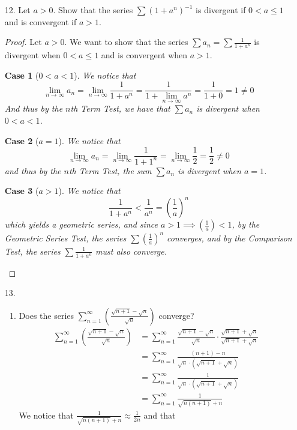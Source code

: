 \documentclass[12pt,letterpaper]{article}
\newcommand{\limx}[2]{\displaystyle\lim\limits_{#1 \to #2}}
\theoremstyle{case}
\newtheorem{case}{Case}
\theoremstyle{definition}
\begin{document}
\begin{enumerate}
\begin{enumerate}
			\item[12.] Let $a > 0$. Show that the series $\sum (1+a^n)^{-1}$ is divergent if $0<a\leq 1$ and is convergent if $a>1$.
			\begin{proof}
				Let $a > 0$. We want to show that the series $\displaystyle \sum a_n=\sum\frac{1}{1+a^n}$ is divergent when $0 < a \leq 1$ and is convergent when $a > 1$.
				\begin{case}[$0<a<1$]
					We notice that
					\[\limx{n}{\infty} a_n = \limx{n}{\infty} \frac{1}{1+a^n}=\frac{1}{1+\limx{n}{\infty}a^n} = \frac{1}{1+0}=1 \neq 0\]
					And thus by the \textit{$n$th Term Test}, we have that $\sum a_n$ is divergent when $0 < a < 1$.
				\end{case}
				\begin{case}[$a=1$]
					We notice that
					\[\limx{n}{\infty} a_n = \limx{n}{\infty} \frac{1}{1+1^n}=\limx{n}{\infty} \frac{1}{2} = \frac{1}{2} \neq 0\]
					and thus by the \textit{$n$th Term Test}, the sum $\sum a_n$ is divergent when $a=1$.
				\end{case}
				\begin{case}[$a>1$]
					We notice that 
					\[\frac{1}{1+a^n}<\frac{1}{a^n}=\left(\frac{1}{a}\right)^n\]
					which yields a geometric series, and since $a > 1 \implies \left(\frac{1}{a}\right) < 1$, by the \textit{Geometric Series Test}, the series $\sum \left(\frac{1}{a}\right)^n$ converges, and by the \textit{Comparison Test}, the series $\sum \frac{1}{1+a^n}$ must also converge.
				\end{case}
			\end{proof}
			\item[13.]
			\begin{enumerate}
				\item Does the series $\displaystyle\sum_{n=1}^{\infty} \left(\frac{\sqrt{n+1}-\sqrt{n}}{\sqrt{n}}\right)$ converge?
				\begin{align*}
					\sum_{n=1}^{\infty} \left(\frac{\sqrt{n+1}-\sqrt{n}}{\sqrt{n}}\right) &= \sum_{n=1}^{\infty} \frac{\sqrt{n+1}-\sqrt{n}}{\sqrt{n}} \cdot \frac{\sqrt{n+1}+\sqrt{n}}{\sqrt{n+1}+\sqrt{n}} \\
					&= \sum_{n=1}^{\infty} \frac{(n+1)-n}{\sqrt{n}\cdot (\sqrt{n+1}+\sqrt{n})} \\
					&= \sum_{n=1}^{\infty} \frac{1}{\sqrt{n}\cdot (\sqrt{n+1}+\sqrt{n})} \\
					&= \sum_{n=1}^{\infty} \frac{1}{\sqrt{n(n+1)}+n}
				\end{align*}
				We notice that $\displaystyle\frac{1}{\sqrt{n(n+1)}+n} \approx \frac{1}{2n}$ and that

\end{enumerate}
\end{enumerate}
\end{enumerate}
\end{document}
